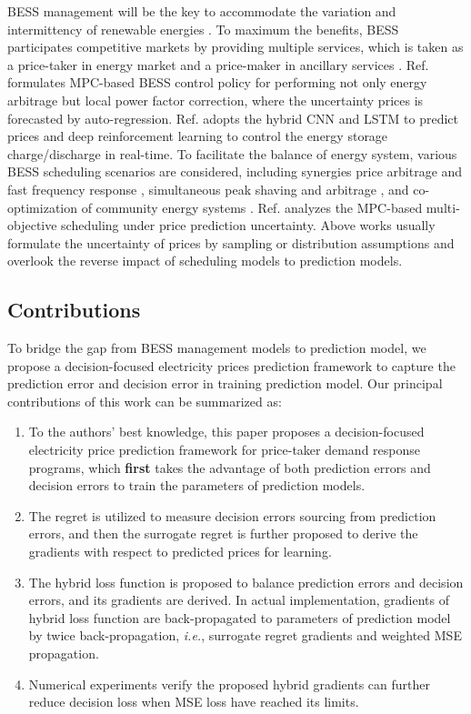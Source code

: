 \documentclass[journal]{IEEEtran}
\begin{document}
BESS management will be the key to accommodate the variation and intermittency of renewable energies \cite{Comello2019}. To maximum the benefits, BESS participates competitive markets by providing multiple services, which is taken as a price-taker in energy market and a price-maker in ancillary services \cite{Arteaga2019}. Ref. \cite{Hashmi2020} formulates MPC-based BESS control policy for performing not only energy arbitrage but local power factor correction, where the uncertainty prices is forecasted by auto-regression. Ref. \cite{Cao2020} adopts the hybrid CNN and LSTM to predict prices and deep reinforcement learning to control the energy storage charge/discharge in real-time. To facilitate the balance of energy system, various BESS scheduling scenarios are considered, including synergies price arbitrage and fast frequency response \cite{Pusceddu2021}, simultaneous peak shaving and arbitrage \cite{Schneider2021}, and co-optimization of community energy systems \cite{Terlouw2019}. Ref. \cite{Nair2021} analyzes the MPC-based multi-objective scheduling under price prediction uncertainty. Above works usually formulate the uncertainty of prices by sampling or distribution assumptions and overlook the reverse impact of scheduling models to prediction models.

\subsection{Contributions}
To bridge the gap from BESS management models to prediction model, we propose a decision-focused electricity prices prediction framework to capture the prediction error and decision error in training prediction model. Our principal contributions of this work can be summarized as:
\begin{enumerate}[\IEEEsetlabelwidth{12)}]
  \item To the authors' best knowledge, this paper proposes a decision-focused electricity price prediction framework for price-taker demand response programs, which \textbf{first} takes the advantage of both prediction errors and decision errors to train the parameters of prediction models.
  \item The regret is utilized to measure decision errors sourcing from prediction errors, and then the surrogate regret is further proposed to derive the gradients with respect to predicted prices for learning.
  \item The hybrid loss function is proposed to balance prediction errors and decision errors, and its gradients are derived. In actual implementation, gradients of hybrid loss function are back-propagated to parameters of prediction model by twice back-propagation, \textit{i.e.}, surrogate regret gradients and weighted MSE propagation.
  \item Numerical experiments verify the proposed hybrid gradients can further reduce decision loss when MSE loss have reached its limits.
\end{enumerate}
\end{document}
